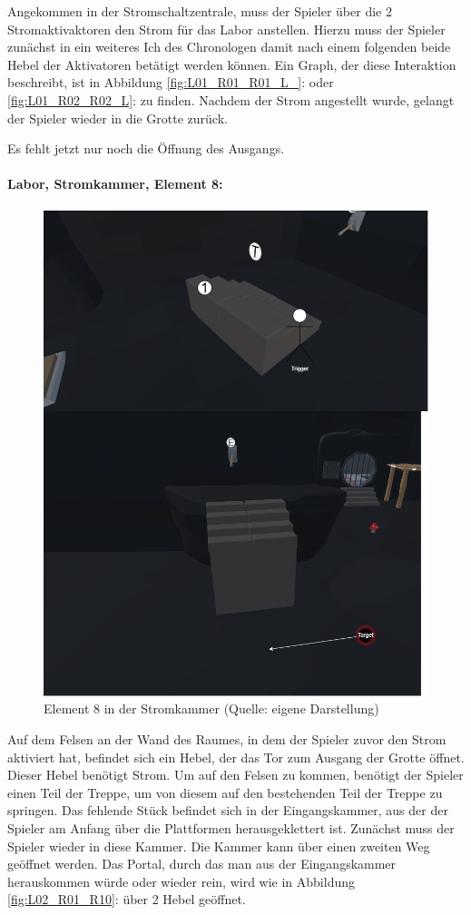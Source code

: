 Angekommen in der Stromschaltzentrale, muss der Spieler über die 2 Stromaktivaktoren den Strom für das Labor anstellen. Hierzu muss der Spieler zunächst in ein weiteres Ich des Chronologen  damit nach einem folgenden  beide Hebel der Aktivatoren betätigt werden können. Ein Graph, der diese Interaktion beschreibt, ist in Abbildung \ref{fig:L01_R01_R01_L_}:  oder \ref{fig:L01_R02_R02_L}:  zu finden. Nachdem der Strom angestellt wurde, gelangt der Spieler wieder in die Grotte zurück.

Es fehlt jetzt nur noch die Öffnung des Ausgangs.

\paragraph{Labor, Stromkammer, Element 8:}\label{p:lse8}

\begin{figure}[ht]
\centering
\includegraphics[width=0.8\linewidth]{content/pictures/Raetsel-L02_R01_R08.jpg}
\caption{Element 8 in der Stromkammer (Quelle: eigene Darstellung)}
\label{fig:L02_R01_R08}
\end{figure}

Auf dem Felsen an der Wand des Raumes, in dem der Spieler zuvor den Strom aktiviert hat, befindet sich ein Hebel, der das Tor zum Ausgang der Grotte öffnet. Dieser Hebel benötigt Strom. Um auf den Felsen zu kommen, benötigt der Spieler einen Teil der Treppe, um von diesem auf den bestehenden Teil der Treppe zu springen. Das fehlende Stück befindet sich in der Eingangskammer, aus der der Spieler am Anfang über die Plattformen herausgeklettert ist. Zunächst muss der Spieler wieder in diese Kammer. Die Kammer kann über einen zweiten Weg geöffnet werden. Das Portal, durch das man aus der Eingangskammer herauskommen würde oder wieder rein, wird wie in Abbildung \ref{fig:L02_R01_R10}:  über 2 Hebel geöffnet.

